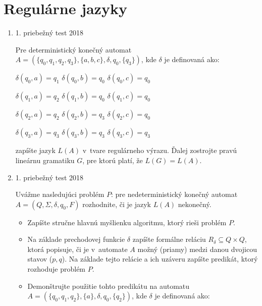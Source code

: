 \documentclass[11pt,a4paper]{article}
\begin{document}
	\section{Regulárne jazyky}
	\begin{enumerate}
		\item 1. priebežný test 2018

		Pre deterministický konečný automat $A = (\{q_0,q_1,q_2,q_3\}, \{a,b,c\}, \delta, q_0, \{q_3\})$, kde $\delta$ je definovaná ako:

		$\delta(q_0, a) = q_1$ \hspace{10pt} $\delta(q_0, b) = q_0$ \hspace{10pt} $\delta(q_0, c) = q_0$

		$\delta(q_1, a) = q_2$ \hspace{10pt} $\delta(q_1, b) = q_0$ \hspace{10pt} $\delta(q_1, c) = q_0$

		$\delta(q_2, a) = q_2$ \hspace{10pt} $\delta(q_2, b) = q_3$ \hspace{10pt} $\delta(q_2, c) = q_0$

		$\delta(q_3, a) = q_3$ \hspace{10pt} $\delta(q_3, b) = q_3$ \hspace{10pt} $\delta(q_3, c) = q_3$

		zapíšte jazyk $L(A)$ v~tvare regulárneho výrazu. Ďalej zostrojte pravú lineárnu gramatiku $G$, pre ktorú platí, že $L(G) = L(A)$.

		\item 1. priebežný test 2018

		Uvážme nasledujúci problém $P$: pre nedeterministický konečný automat $A = (Q, \Sigma, \delta, q_0, F)$ rozhodnite, či je jazyk $L(A)$ nekonečný.

		\begin{itemize}
			\item Zapíšte stručne hlavnú myšlienku algoritmu, ktorý rieši problém $P$.
			\item Na základe prechodovej funkcie $\delta$ zapíšte formálne reláciu $R_\delta \subseteq Q \times Q$, ktorá popisuje, či je v~automate $A$ možný (priamy) medzi danou dvojicou stavov ($p,q$). Na základe tejto relácie a ich uzáveru zapíšte predikát, ktorý rozhoduje problém $P$.
			\item Demonštrujte použitie tohto predikátu na automatu $A = (\{q_0,q_1,q_2\}, \{a\}, \delta, q_0, \{q_2\})$, kde $\delta$ je definovaná ako:


\end{itemize}
\end{enumerate}
\end{document}
